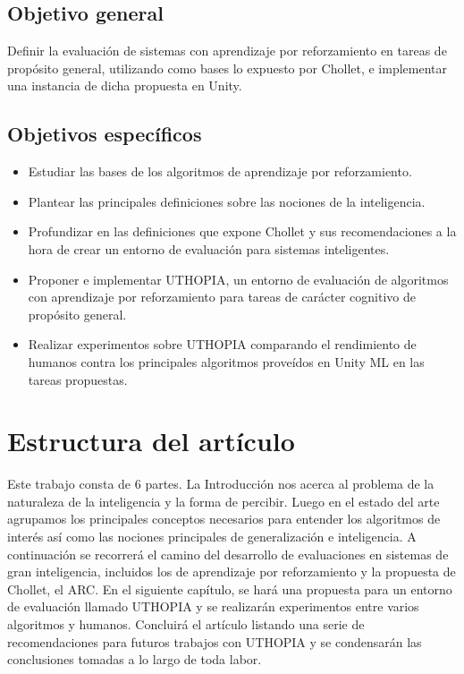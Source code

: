 \subsection*{Objetivo general}
Definir la evaluación de sistemas con aprendizaje por reforzamiento en tareas de propósito general, utilizando como bases lo expuesto por Chollet, e implementar una instancia de dicha propuesta en Unity.

\subsection*{Objetivos específicos}
\begin{itemize}
    \item Estudiar las bases de los algoritmos de aprendizaje por reforzamiento.
    \item Plantear las principales definiciones sobre las nociones de la inteligencia.
    \item Profundizar en las definiciones que expone Chollet y sus recomendaciones a la hora de crear un entorno de evaluación para sistemas inteligentes.
    \item Proponer e implementar UTHOPIA, un entorno de evaluación de algoritmos con aprendizaje por reforzamiento para tareas de carácter cognitivo de propósito general.
    \item Realizar experimentos sobre UTHOPIA comparando el rendimiento de humanos contra los principales algoritmos proveídos en Unity ML en las tareas propuestas.
\end{itemize}

\section*{Estructura del artículo}
Este trabajo consta de 6 partes. La Introducción nos acerca al problema de la naturaleza de la inteligencia y la forma de percibir. Luego en el estado del arte agrupamos los principales conceptos necesarios para entender los algoritmos de interés así como las nociones principales de generalización e inteligencia. A continuación se recorrerá el camino del desarrollo de evaluaciones en sistemas de gran inteligencia, incluidos los de aprendizaje por reforzamiento y la propuesta de Chollet, el ARC. En el siguiente capítulo, se hará una propuesta para un entorno de evaluación llamado UTHOPIA y se realizarán experimentos entre varios algoritmos y humanos. Concluirá el artículo listando una serie de recomendaciones para futuros trabajos con UTHOPIA y se condensarán las conclusiones tomadas a lo largo de toda labor. 


